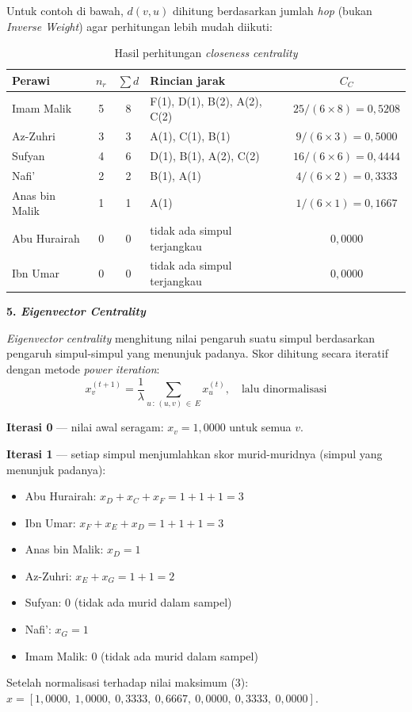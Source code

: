\noindent Untuk contoh di bawah, $d(v,u)$ dihitung berdasarkan jumlah \textit{hop} (bukan \textit{Inverse Weight}) agar perhitungan lebih mudah diikuti:

\begin{table}[H]
\centering
\caption{Hasil perhitungan \textit{closeness centrality}}
\label{lamp:tab:closeness}
\begin{tabular}{|l|c|c|l|c|}
\hline
\textbf{Perawi} & $n_r$ & $\sum d$ & \textbf{Rincian jarak} & $C_C$ \\
\hline
Imam Malik   & 5 & 8 & F(1), D(1), B(2), A(2), C(2) & $25 / (6 \times 8) = 0{,}5208$ \\
Az-Zuhri     & 3 & 3 & A(1), C(1), B(1)              & $9 / (6 \times 3) = 0{,}5000$ \\
Sufyan       & 4 & 6 & D(1), B(1), A(2), C(2)        & $16 / (6 \times 6) = 0{,}4444$ \\
Nafi'        & 2 & 2 & B(1), A(1)                    & $4 / (6 \times 2) = 0{,}3333$ \\
Anas bin Malik & 1 & 1 & A(1)                        & $1 / (6 \times 1) = 0{,}1667$ \\
Abu Hurairah & 0 & 0 & tidak ada simpul terjangkau   & $0{,}0000$ \\
Ibn Umar     & 0 & 0 & tidak ada simpul terjangkau   & $0{,}0000$ \\
\hline
\end{tabular}
\end{table}

\vspace{0.3cm}
\noindent\textbf{5. \textit{Eigenvector Centrality}}

\vspace{0.2cm}
\noindent \textit{Eigenvector centrality} menghitung nilai pengaruh suatu simpul berdasarkan pengaruh simpul-simpul yang menunjuk padanya. Skor dihitung secara iteratif dengan metode \textit{power iteration}:
$$x_v^{(t+1)} = \frac{1}{\lambda} \sum_{u\,:\,(u,v)\,\in\,E} x_u^{(t)}, \quad \text{lalu dinormalisasi}$$

\noindent\textbf{Iterasi 0} --- nilai awal seragam: $x_v = 1{,}0000$ untuk semua $v$.

\noindent\textbf{Iterasi 1} --- setiap simpul menjumlahkan skor murid-muridnya (simpul yang menunjuk padanya):
\begin{itemize}
    \item Abu Hurairah: $x_D + x_C + x_F = 1 + 1 + 1 = 3$
    \item Ibn Umar: $x_F + x_E + x_D = 1 + 1 + 1 = 3$
    \item Anas bin Malik: $x_D = 1$
    \item Az-Zuhri: $x_E + x_G = 1 + 1 = 2$
    \item Sufyan: $0$ (tidak ada murid dalam sampel)
    \item Nafi': $x_G = 1$
    \item Imam Malik: $0$ (tidak ada murid dalam sampel)
\end{itemize}
Setelah normalisasi terhadap nilai maksimum (3):\\
$x = [1{,}0000,\ 1{,}0000,\ 0{,}3333,\ 0{,}6667,\ 0{,}0000,\ 0{,}3333,\ 0{,}0000]$.

